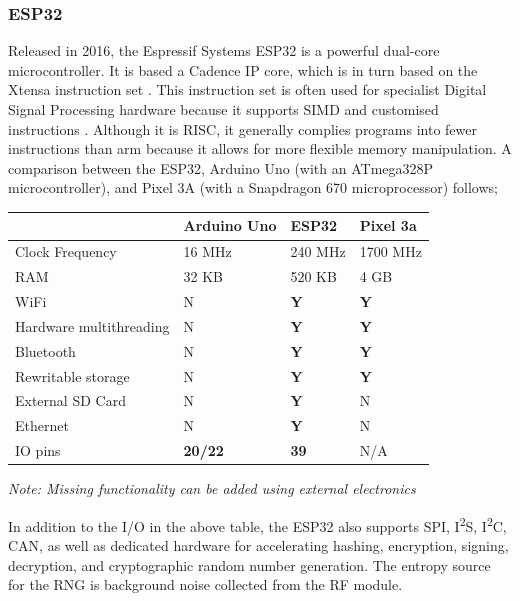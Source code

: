 \documentclass{article}
\begin{document}
\subsubsection{ESP32}

Released in 2016, the Espressif Systems ESP32 is a powerful dual-core microcontroller.
It is based a Cadence IP core, which is in turn based on the Xtensa instruction set \cite{32datasheet}.
This instruction set is often used for specialist Digital Signal Processing hardware because it supports SIMD and customised instructions \cite{lx6datasheet}.
Although it is RISC, it generally complies programs into fewer instructions than arm because it allows for more flexible memory manipulation.
A comparison between the ESP32, Arduino Uno (with an ATmega328P microcontroller), and Pixel 3A (with a Snapdragon 670 microprocessor) follows;

\begin{table}[H]
\begin{tabular}{l|lll}
						& Arduino Uno		& ESP32		& Pixel 3a		\\ \hline
Clock Frequency			& 16 MHz			& 240 MHz		& 1700 MHz		\\ \hline
RAM						& 32 KB				& 520 KB		& 4 GB			\\ \hline
WiFi 					& N 				& \textbf{Y}	& \textbf{Y}	\\ \hline
Hardware multithreading	& N 				& \textbf{Y}	& \textbf{Y}	\\ \hline
Bluetooth				& N 				& \textbf{Y}	& \textbf{Y}	\\ \hline
Rewritable storage		& N 				& \textbf{Y}	& \textbf{Y}	\\ \hline
External SD Card		& N 				& \textbf{Y}	& N				\\ \hline
Ethernet				& N 				& \textbf{Y}	& N				\\ \hline
IO pins					& \textbf{20/22}	& \textbf{39}	& N/A			\\

\end{tabular}
\end{table}

\emph{Note: Missing functionality can be added using external electronics}

In addition to the I/O in the above table, the ESP32 also supports SPI, I\textsuperscript{2}S, I\textsuperscript{2}C, CAN, as well as dedicated hardware for accelerating hashing, encryption, signing, decryption, and cryptographic random number generation.
The entropy source for the RNG is background noise collected from the RF module.
\end{document}

